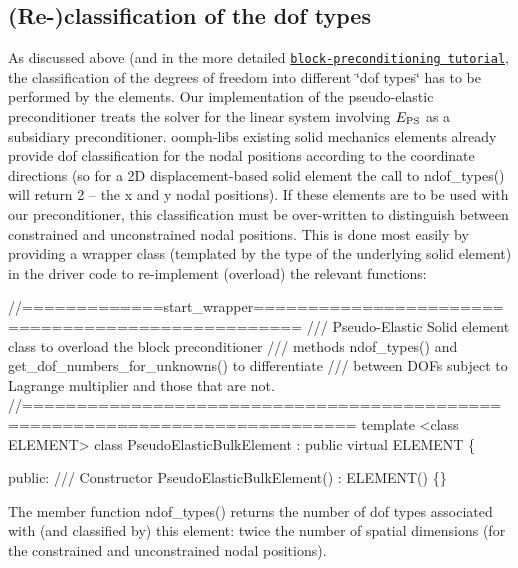 \hypertarget{index_reclass}{}\subsection{(\+Re-\/)classification of the dof types}\label{index_reclass}
As discussed above (and in the more detailed \href{../../../mpi/block_preconditioners/html/index.html}{\tt block-\/preconditioning tutorial}, the classification of the degrees of freedom into different \char`\"{}dof types\char`\"{} has to be performed by the elements. Our implementation of the pseudo-\/elastic preconditioner treats the solver for the linear system involving $ E_{\rm PS} $ as a subsidiary preconditioner. {\ttfamily oomph-\/lib\textquotesingle{}s} existing solid mechanics elements already provide dof classification for the nodal positions according to the coordinate directions (so for a 2D displacement-\/based solid element the call to {\ttfamily ndof\+\_\+types()} will return 2 -- the x and y nodal positions). If these elements are to be used with our preconditioner, this classification must be over-\/written to distinguish between constrained and unconstrained nodal positions. This is done most easily by providing a wrapper class (templated by the type of the underlying solid element) in the driver code to re-\/implement (overload) the relevant functions\+:

 
\begin{DoxyCodeInclude}
\textcolor{comment}{//=============start\_wrapper==================================================}
\textcolor{comment}{/// Pseudo-Elastic Solid element class to overload the block preconditioner}
\textcolor{comment}{}\textcolor{comment}{/// methods ndof\_types() and get\_dof\_numbers\_for\_unknowns() to differentiate}
\textcolor{comment}{}\textcolor{comment}{/// between DOFs subject to Lagrange multiplier and those that are not.}
\textcolor{comment}{}\textcolor{comment}{//============================================================================}
\textcolor{keyword}{template} <\textcolor{keyword}{class} ELEMENT>
\textcolor{keyword}{class }PseudoElasticBulkElement : 
 \textcolor{keyword}{public} \textcolor{keyword}{virtual} ELEMENT
\{

\textcolor{keyword}{public}:
\textcolor{comment}{}
\textcolor{comment}{ /// Constructor}
\textcolor{comment}{} PseudoElasticBulkElement() : ELEMENT() \{\}

\end{DoxyCodeInclude}


The member function {\ttfamily ndof\+\_\+types()} returns the number of dof types associated with (and classified by) this element\+: twice the number of spatial dimensions (for the constrained and unconstrained nodal positions).


